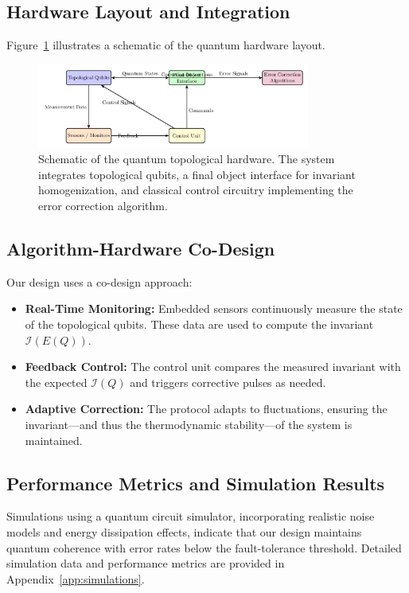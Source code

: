\documentclass[11pt]{article}
\begin{document}
\subsection{Hardware Layout and Integration}
Figure~\ref{fig:hardware} illustrates a schematic of the quantum hardware layout.
\begin{figure}[ht]
\centering
\includegraphics[width=0.8\textwidth]{hardware_layout.png}
\caption{Schematic of the quantum topological hardware. The system integrates topological qubits, a final object interface for invariant homogenization, and classical control circuitry implementing the error correction algorithm.}
\label{fig:hardware}
\end{figure}

\subsection{Algorithm-Hardware Co-Design}
Our design uses a co-design approach:
\begin{itemize}
    \item \textbf{Real-Time Monitoring:} Embedded sensors continuously measure the state of the topological qubits. These data are used to compute the invariant \(\mathcal{I}(E(Q))\).
    \item \textbf{Feedback Control:} The control unit compares the measured invariant with the expected \(\mathcal{I}(Q)\) and triggers corrective pulses as needed.
    \item \textbf{Adaptive Correction:} The protocol adapts to fluctuations, ensuring the invariant—and thus the thermodynamic stability—of the system is maintained.
\end{itemize}

\subsection{Performance Metrics and Simulation Results}
Simulations using a quantum circuit simulator, incorporating realistic noise models and energy dissipation effects, indicate that our design maintains quantum coherence with error rates below the fault-tolerance threshold. Detailed simulation data and performance metrics are provided in Appendix~\ref{app:simulations}.
\end{document}
